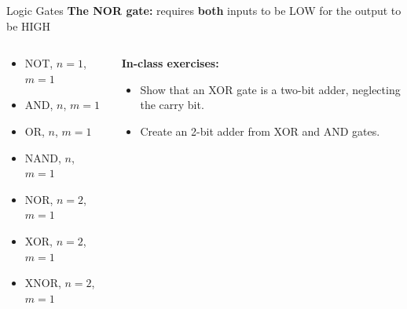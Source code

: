 \documentclass{beamer}
\begin{document}
\begin{frame}{Logic Gates}
\textbf{The NOR gate:} requires \textbf{both} inputs to be LOW for the output to be HIGH \\ \vspace{0.5cm}
\begin{columns}[T]
\begin{column}{0.5\textwidth}
\begin{itemize}
\item \alert{NOT, $n=1$, $m=1$}
\item \alert{AND, $n$, $m=1$}
\item \alert{OR, $n$, $m=1$}
\item \alert{NAND, $n$, $m=1$}
\item \alert{NOR, $n=2$, $m=1$}
\item \alert{XOR, $n=2$, $m=1$}
\item \alert{XNOR, $n=2$, $m=1$}
\end{itemize}
\end{column}
\begin{column}{0.5\textwidth}
\tiny
\textbf{In-class exercises:}
\begin{itemize}
\item Show that an XOR gate is a two-bit adder, neglecting the carry bit.
\item Create an 2-bit adder from XOR and AND gates.
\end{itemize}
\end{column}
\end{columns}
\end{frame}
\end{document}
